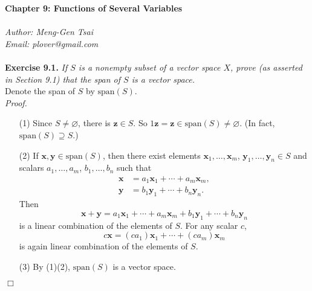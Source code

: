 \documentclass{article}
\begin{document}
\textbf{\Large Chapter 9: Functions of Several Variables} \\\\



\emph{Author: Meng-Gen Tsai} \\
\emph{Email: plover@gmail.com} \\\\









\textbf{Exercise 9.1.}
\emph{If $S$ is a nonempty subset of a vector space $X$,
prove (as asserted in Section 9.1) that the span of $S$ is a vector space.} \\

Denote the span of $S$ by $\mathrm{span}(S)$. \\

\emph{Proof.}
\begin{enumerate}
\item[(1)]
  Since $S \neq \varnothing$, there is $\mathbf{z} \in S$.
  So $1\mathbf{z} = \mathbf{z} \in \mathrm{span}(S) \neq \varnothing$.
  (In fact, $\mathrm{span}(S) \supseteq S$.)

\item[(2)]
  If $\mathbf{x}, \mathbf{y} \in \mathrm{span}(S)$,
  then there exist elements
  $\mathbf{x}_1, \ldots, \mathbf{x}_m$, $\mathbf{y}_1, \ldots, \mathbf{y}_n \in S$
  and scalars $a_1, \ldots, a_m$, $b_1, \ldots, b_n$ such that
  \begin{align*}
    \mathbf{x} &= a_1 \mathbf{x}_1 + \cdots + a_m \mathbf{x}_m, \\
    \mathbf{y} &= b_1 \mathbf{y}_1 + \cdots + b_n \mathbf{y}_n.
  \end{align*}
  Then
  \[
    \mathbf{x}+\mathbf{y}
    = a_1 \mathbf{x}_1 + \cdots + a_m \mathbf{x}_m
      + b_1 \mathbf{y}_1 + \cdots + b_n \mathbf{y}_n
  \]
  is a linear combination of the elements of $S$.
  For any scalar $c$,
  \[
    c\mathbf{x} = (ca_1) \mathbf{x}_1 + \cdots + (ca_m) \mathbf{x}_m
  \]
  is again linear combination of the elements of $S$.

\item[(3)]
  By (1)(2), $\mathrm{span}(S)$ is a vector space.
\end{enumerate}
$\Box$ \\
\end{document}

